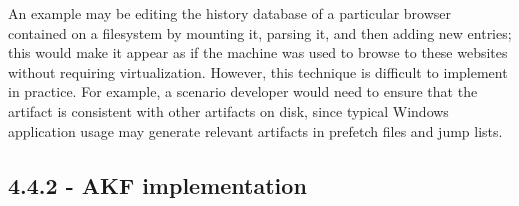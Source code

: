 An example may be editing the history database of a particular browser
contained on a filesystem by mounting it, parsing it, and then adding
new entries; this would make it appear as if the machine was used to
browse to these websites without requiring virtualization. However, this
technique is difficult to implement in practice. For example, a scenario
developer would need to ensure that the artifact is consistent with
other artifacts on disk, since typical Windows application usage may
generate relevant artifacts in prefetch files and jump lists.

\subsection*{4.4.2 - AKF implementation}\label{akf-implementation}
